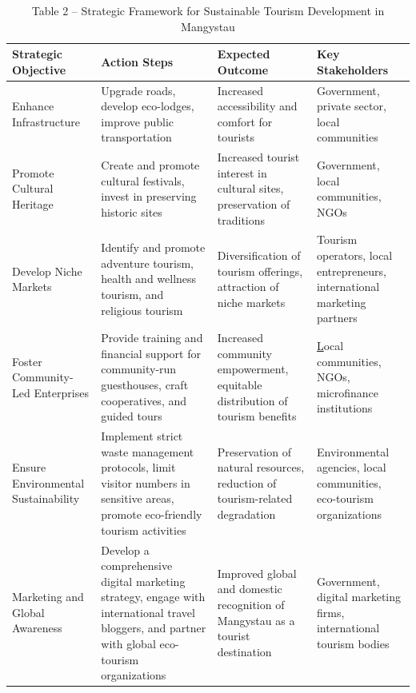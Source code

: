 \begin{table}[H]
\caption*{Table 2 -- Strategic Framework for Sustainable Tourism Development in Mangystau}
\centering
\begin{tabular}{|p{}|p{}|p{}|p{}|}
\hline
Strategic Objective &
  Action Steps &
  Expected Outcome &
  Key Stakeholders \\ \hline
Enhance Infrastructure &
  Upgrade roads, develop eco-lodges, improve public transportation &
  Increased accessibility and comfort for tourists &
  Government, private sector, local communities \\ \hline
Promote Cultural Heritage &
  Create and promote cultural festivals, invest in preserving historic sites &
  Increased tourist interest in cultural sites, preservation of traditions &
  Government, local communities, NGOs \\ \hline
Develop Niche Markets &
  Identify and promote adventure tourism, health and wellness tourism, and religious tourism &
  Diversification of tourism offerings, attraction of niche markets &
  Tourism operators, local entrepreneurs, international marketing partners \\ \hline
Foster Community-Led Enterprises &
  Provide training and financial support for community-run guesthouses, craft cooperatives, and guided tours &
  Increased community empowerment, equitable distribution of tourism benefits &
  {\ul Local communities, NGOs, microfinance institutions} \\ \hline
Ensure Environmental Sustainability &
  Implement strict waste management protocols, limit visitor numbers in sensitive areas, promote eco-friendly tourism activities &
  Preservation of natural resources, reduction of tourism-related degradation &
  Environmental agencies, local communities, eco-tourism organizations \\ \hline
Marketing and Global Awareness &
  Develop a comprehensive digital marketing strategy, engage with international travel bloggers, and partner with global eco-tourism organizations &
  Improved global and domestic recognition of Mangystau as a tourist destination &
  Government, digital marketing firms, international tourism bodies \\ \hline
\end{tabular}
\end{table}

